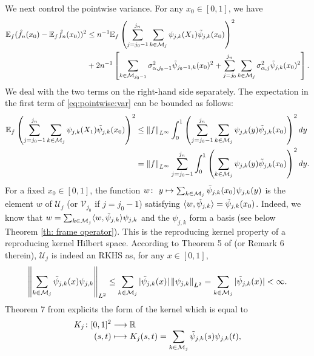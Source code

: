 \documentclass[preprint]{imsart}
\newcommand\norm[1]{\left\lVert#1\right\rVert}
\numberwithin{equation}{section}
\begin{document}
\begin{appendix}
We next control the pointwise variance. For any $x_0\in [0,1]$, we have
\begin{align}
\mathbb{E}_f(\hat{f}_n(x_0)-\mathbb{E}_f\hat{f}_n(x_0))^2 &\leq n^{-1} \mathbb{E}_f \left(  \sum_{j=j_0-1}^{j_n}\sum_{k\in\mathcal{M}_{j}} \psi_{j,k}(X_1)\Tilde{\psi}_{j,k}(x_0) \right)^2\nonumber\\
&+2n^{-1}\left[\sum_{k\in\mathcal{M}_{j_0-1}} \sigma_{\alpha,j_0-1}^2 \Tilde{\psi}_{j_0-1,k}(x_0)^2 + \sum_{j=j_0}^{j_n}\sum_{k\in\mathcal{M}_{j}} \sigma_{\alpha,j}^2\Tilde{\psi}_{j,k}(x_0)^2\right].\label{eq:pointwise:var}
\end{align}
We deal with the two terms on the right-hand side separately.
The expectation in the first term of \eqref{eq:pointwise:var} can be bounded as follows:
\begin{align*}
    \mathbb{E}_f \left(  \sum_{j=j_0-1}^{j_n}\sum_{k\in\mathcal{M}_{j}} \psi_{j,k}(X_1)\Tilde{\psi}_{j,k}(x_0) \right)^2 &\leq \norm{f}_{L^\infty} \int_0^1 \left(  \sum_{j=j_0-1}^{j_n}\sum_{k\in\mathcal{M}_{j}} \psi_{j,k}(y)\Tilde{\psi}_{j,k}(x_0) \right)^2 dy\\
    &= \norm{f}_{L^\infty} \sum_{j=j_0-1}^{j_n}\int_0^1 \left(\sum_{k\in\mathcal{M}_{j}} \psi_{j,k}(y)\Tilde{\psi}_{j,k}(x_0) \right)^2 dy.
\end{align*}
For a fixed $x_0\in[0,1]$, the function $w\colon\ y\mapsto \sum_{k\in\mathcal{M}_{j}}\Tilde{\psi}_{j,k}(x_0) \psi_{j,k}(y)$ is the element $w$ of $\mathcal{U}_j$ (or $\mathcal{V}_{j_0}$ if $j=j_0-1$) satisfying $\langle w, \Tilde{\psi}_{j,k}\rangle = \Tilde{\psi}_{j,k}(x_0)$. Indeed,  we know that $w = \sum_{k\in\mathcal{M}_{j}}\langle w, \Tilde{\psi}_{j,k}\rangle \psi_{j,k}$ and the $\psi_{j,k}$ form a basis (see below Theorem \ref{th: frame operator}). This is the reproducing kernel property of a reproducing kernel Hilbert space. According to Theorem 5 of \cite{Rakotomamonjy2005} (or Remark 6 therein), $\mathcal{U}_j$ is indeed an RKHS as, for any $x\in [0,1]$, 
\[\norm{\sum_{k\in\mathcal{M}_{j}}\Tilde{\psi}_{j,k}(x) \psi_{j,k}}_{L^2} \leq \sum_{k\in\mathcal{M}_{j}}|\Tilde{\psi}_{j,k}(x)| \norm{\psi_{j,k}}_{L^2}= \sum_{k\in\mathcal{M}_{j}}|\Tilde{\psi}_{j,k}(x)| < \infty.\]
Theorem 7 from \cite{Rakotomamonjy2005} explicits the form of the kernel which is equal to
\begin{align*}
  K_j\colon [0,1]^2 & \longrightarrow \mathbb{R} \\[-1ex]
  (s,t) & \longmapsto K_j(s,t) = \sum_{k\in\mathcal{M}_{j}}\Tilde{\psi}_{j,k}(s) \psi_{j,k}(t),
\end{align*}

\end{appendix}
\end{document}
